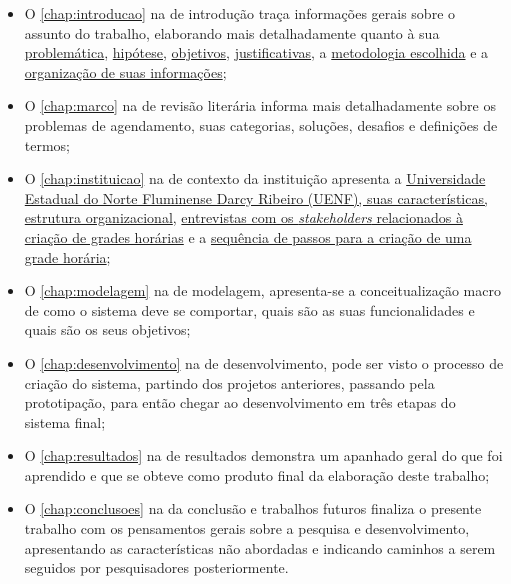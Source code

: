 \begin{itemize}
      \item O \autoref{chap:introducao} na  de introdução traça informações gerais sobre o assunto do trabalho, elaborando mais detalhadamente quanto à sua \hyperref[sec:Problemáticas]{problemática}, \hyperref[sec:Hipótese]{hipótese}, \hyperref[sec:Objetivos]{objetivos}, \hyperref[sec:Justificativas]{justificativas}, a \hyperref[sec:Metodologia]{metodologia escolhida} e a \hyperref[sec:Organização]{organização de suas informações};
      \item O \autoref{chap:marco} na  de revisão literária informa mais detalhadamente sobre os problemas de agendamento, suas categorias, soluções, desafios e definições de termos;
      \item O \autoref{chap:instituicao} na  de contexto da instituição apresenta a \hyperref[sec:estatuto]{Universidade Estadual do Norte Fluminense Darcy Ribeiro (UENF), suas características, estrutura organizacional}, \hyperref[sec:entrevistas]{entrevistas com os \textit{stakeholders} relacionados à criação de grades horárias} e a \hyperref[sec:sequencia]{sequência de passos para a criação de uma grade horária};
      \item O \autoref{chap:modelagem} na  de modelagem, apresenta-se a conceitualização macro de como o sistema deve se comportar, quais são as suas funcionalidades e quais são os seus objetivos;
      \item O \autoref{chap:desenvolvimento} na  de desenvolvimento, pode ser visto o processo de criação do sistema, partindo dos projetos anteriores, passando pela prototipação, para então chegar ao desenvolvimento em três etapas do sistema final;
      \item O \autoref{chap:resultados} na  de resultados demonstra um apanhado geral do que foi aprendido e que se obteve como produto final da elaboração deste trabalho;
      \item O \autoref{chap:conclusoes} na  da conclusão e trabalhos futuros finaliza o presente trabalho com os pensamentos gerais sobre a pesquisa e desenvolvimento, apresentando as características não abordadas e indicando caminhos a serem seguidos por pesquisadores posteriormente.
\end{itemize}

